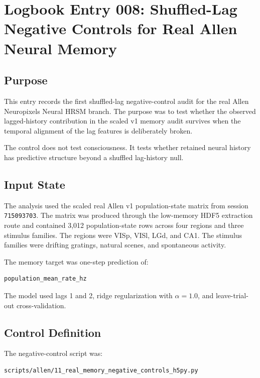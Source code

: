 \section{Logbook Entry 008: Shuffled-Lag Negative Controls for Real Allen Neural Memory}
\label{sec:logbook-entry-008-real-allen-memory-controls}

\subsection{Purpose}

This entry records the first shuffled-lag negative-control audit for the real Allen Neuropixels Neural HRSM branch. The purpose was to test whether the observed lagged-history contribution in the scaled v1 memory audit survives when the temporal alignment of the lag features is deliberately broken.

The control does not test consciousness. It tests whether retained neural history has predictive structure beyond a shuffled lag-history null.

\subsection{Input State}

The analysis used the scaled real Allen v1 population-state matrix from session \texttt{715093703}. The matrix was produced through the low-memory HDF5 extraction route and contained 3,012 population-state rows across four regions and three stimulus families. The regions were VISp, VISl, LGd, and CA1. The stimulus families were drifting gratings, natural scenes, and spontaneous activity.

The memory target was one-step prediction of:

\begin{verbatim}
population_mean_rate_hz
\end{verbatim}

The model used lags 1 and 2, ridge regularization with \(\alpha = 1.0\), and leave-trial-out cross-validation.

\subsection{Control Definition}

The negative-control script was:

\begin{verbatim}
scripts/allen/11_real_memory_negative_controls_h5py.py
\end{verbatim}

